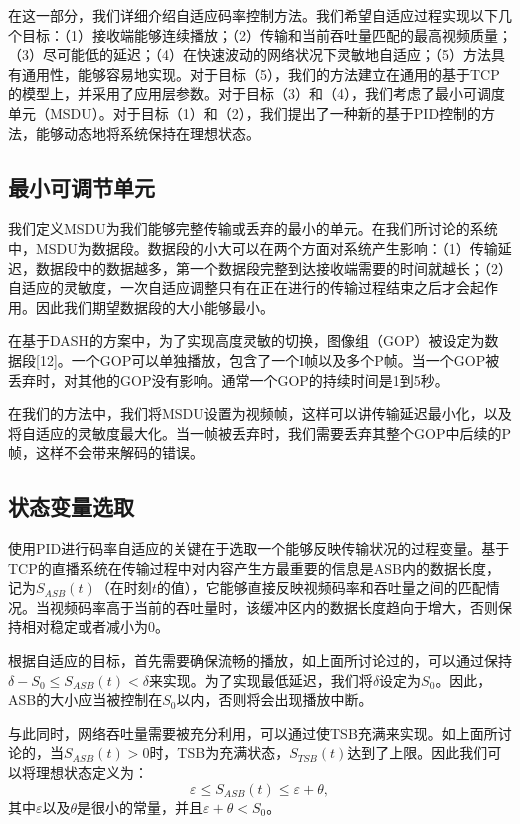 在这一部分，我们详细介绍自适应码率控制方法。我们希望自适应过程实现以下几个目标：（1）接收端能够连续播放；（2）传输和当前吞吐量匹配的最高视频质量；（3）尽可能低的延迟；（4）在快速波动的网络状况下灵敏地自适应；（5）方法具有通用性，能够容易地实现。对于目标（5），我们的方法建立在通用的基于TCP的模型上，并采用了应用层参数。对于目标（3）和（4），我们考虑了最小可调度单元（MSDU）。对于目标（1）和（2），我们提出了一种新的基于PID控制的方法，能够动态地将系统保持在理想状态。

\subsection{最小可调节单元}

我们定义MSDU为我们能够完整传输或丢弃的最小的单元。在我们所讨论的系统中，MSDU为数据段。数据段的小大可以在两个方面对系统产生影响：（1）传输延迟，数据段中的数据越多，第一个数据段完整到达接收端需要的时间就越长；（2）自适应的灵敏度，一次自适应调整只有在正在进行的传输过程结束之后才会起作用。因此我们期望数据段的大小能够最小。

在基于DASH的方案中，为了实现高度灵敏的切换，图像组（GOP）被设定为数据段[12]。一个GOP可以单独播放，包含了一个I帧以及多个P帧。当一个GOP被丢弃时，对其他的GOP没有影响。通常一个GOP的持续时间是1到5秒。

在我们的方法中，我们将MSDU设置为视频帧，这样可以讲传输延迟最小化，以及将自适应的灵敏度最大化。当一帧被丢弃时，我们需要丢弃其整个GOP中后续的P帧，这样不会带来解码的错误。

\subsection{状态变量选取}

使用PID进行码率自适应的关键在于选取一个能够反映传输状况的过程变量。基于TCP的直播系统在传输过程中对内容产生方最重要的信息是ASB内的数据长度，记为$S_{ASB}(t)$（在时刻$t$的值），它能够直接反映视频码率和吞吐量之间的匹配情况。当视频码率高于当前的吞吐量时，该缓冲区内的数据长度趋向于增大，否则保持相对稳定或者减小为0。

根据自适应的目标，首先需要确保流畅的播放，如上面所讨论过的，可以通过保持$\delta - S_0 \le S_{ASB}(t) < \delta$来实现。为了实现最低延迟，我们将$\delta$设定为$S_0$。因此，ASB的大小应当被控制在$S_0$以内，否则将会出现播放中断。

与此同时，网络吞吐量需要被充分利用，可以通过使TSB充满来实现。如上面所讨论的，当$S_{ASB}(t)>0$时，TSB为充满状态，$S_{TSB}(t)$达到了上限。因此我们可以将理想状态定义为：
\begin{equation}
\varepsilon \le S_{ASB}(t) \le \varepsilon+\theta,
\end{equation}
其中$\varepsilon$以及$\theta$是很小的常量，并且$\varepsilon+\theta<S_0$。


